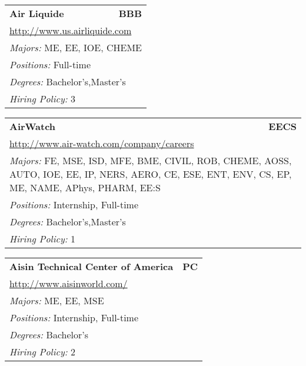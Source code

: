 \documentclass[twoside]{article}
\begin{document}
\begin{center}
\begin{multicols}{3}
\begin{FlushLeft}
\begin{minipage}{\columnwidth}
\end{minipage}
 
\begin{minipage}{\columnwidth}\begin{tabularx}{.95\columnwidth}{Xr}
                 {\Large\bf Air Liquide} & {\Large\bf BBB}\\
    \multicolumn{2}{p{.95\columnwidth}}{\url{http://www.us.airliquide.com}}\\
    \multicolumn{2}{p{.95\columnwidth}}{\emph{Majors:} ME, EE, IOE, CHEME}\\
    \multicolumn{2}{p{.95\columnwidth}}{\emph{Positions:} Full-time}\\
    \multicolumn{2}{p{.95\columnwidth}}{\emph{Degrees:} Bachelor's,Master's}\\
    \multicolumn{2}{p{.95\columnwidth}}{\emph{Hiring Policy:} 3}\\
    \end{tabularx}
    
\end{minipage}
 
\begin{minipage}{\columnwidth}\begin{tabularx}{.95\columnwidth}{Xr}
                 {\Large\bf AirWatch} & {\Large\bf EECS}\\
    \multicolumn{2}{p{.95\columnwidth}}{\url{http://www.air-watch.com/company/careers}}\\
    \multicolumn{2}{p{.95\columnwidth}}{\emph{Majors:} FE, MSE, ISD, MFE, BME, CIVIL, ROB, CHEME, AOSS, AUTO, IOE, EE, IP, NERS, AERO, CE, ESE, ENT, ENV, CS, EP, ME, NAME, APhys, PHARM, EE:S}\\
    \multicolumn{2}{p{.95\columnwidth}}{\emph{Positions:} Internship, Full-time}\\
    \multicolumn{2}{p{.95\columnwidth}}{\emph{Degrees:} Bachelor's,Master's}\\
    \multicolumn{2}{p{.95\columnwidth}}{\emph{Hiring Policy:} 1}\\
    \end{tabularx}
    
\end{minipage}
 
\begin{minipage}{\columnwidth}\begin{tabularx}{.95\columnwidth}{Xr}
                 {\Large\bf Aisin Technical Center of America} & {\Large\bf PC}\\
    \multicolumn{2}{p{.95\columnwidth}}{\url{http://www.aisinworld.com/}}\\
    \multicolumn{2}{p{.95\columnwidth}}{\emph{Majors:} ME, EE, MSE}\\
    \multicolumn{2}{p{.95\columnwidth}}{\emph{Positions:} Internship, Full-time}\\
    \multicolumn{2}{p{.95\columnwidth}}{\emph{Degrees:} Bachelor's}\\
    \multicolumn{2}{p{.95\columnwidth}}{\emph{Hiring Policy:} 2}\\
    \end{tabularx}
    

\end{minipage}
\end{FlushLeft}
\end{multicols}
\end{center}
\end{document}
